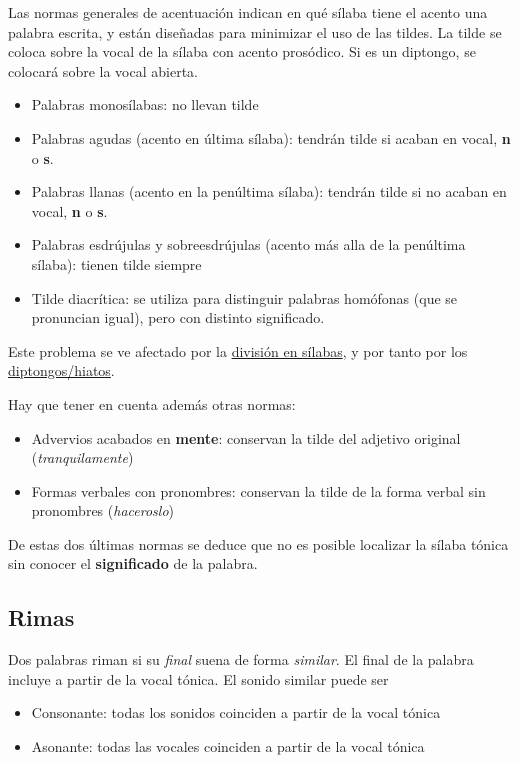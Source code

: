 \documentclass[11pt]{article}
\begin{document}
Las normas generales de acentuación indican en qué sílaba tiene el acento una palabra escrita, y están diseñadas para minimizar el uso de las tildes. La tilde se coloca sobre la vocal de la sílaba con acento prosódico. Si es un diptongo, se colocará sobre la vocal abierta.
\begin{itemize}
\item Palabras monosílabas: no llevan tilde
\item Palabras agudas (acento en última sílaba): tendrán tilde si acaban en vocal, \textbf{n} o \textbf{s}.
\item Palabras llanas (acento en la penúltima sílaba): tendrán tilde si no acaban en vocal, \textbf{n} o \textbf{s}.
\item Palabras esdrújulas y sobreesdrújulas (acento más alla de la penúltima sílaba): tienen tilde siempre
\item Tilde diacrítica: se utiliza para distinguir palabras homófonas (que se  pronuncian igual), pero con distinto significado.
\end{itemize}

Este problema se ve afectado por la \hyperref[separar-silabas]{división en sílabas}, y por tanto por los \hyperref[diptongos-hiatos]{diptongos/hiatos}.

Hay que tener en cuenta además otras normas:
\begin{itemize}
\item Advervios acabados en \textbf{mente}: conservan la tilde del adjetivo original (\emph{tranquilamente})
\item Formas verbales con pronombres: conservan la tilde de la forma verbal sin pronombres (\emph{haceroslo})
\end{itemize}

De estas dos últimas normas se deduce que no es posible localizar la sílaba tónica sin conocer el \textbf{significado} de la palabra.   


\subsection{Rimas}
\label{sec:org0000015}
Dos palabras riman si su \emph{final} suena de forma \emph{similar}. El final de la palabra incluye a partir de la vocal tónica. El sonido similar puede ser
\begin{itemize}
\item Consonante: todas los sonidos coinciden a partir de la vocal tónica
\item Asonante: todas las vocales coinciden a partir de la vocal tónica
\end{itemize}
\end{document}
